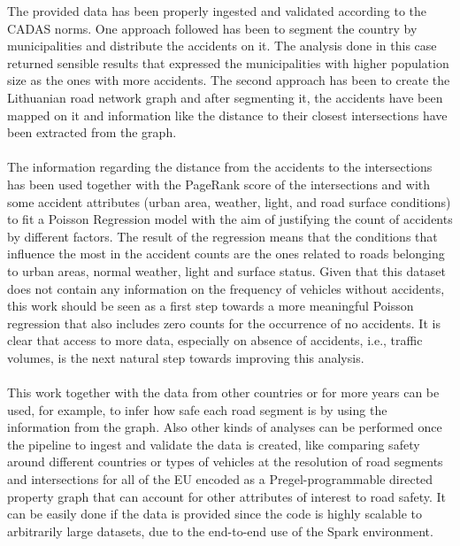 The provided data has been properly ingested and validated according to the \ac{CADAS} norms. One approach followed has been to segment the country by municipalities and distribute the accidents on it. The analysis done in this case returned sensible results that expressed the municipalities with higher population size as the ones with more accidents. The second approach has been to create the Lithuanian road network graph and after segmenting it, the accidents have been mapped on it and information like the distance to their closest intersections have been extracted from the graph. \\
\\
The information regarding the distance from the accidents to the intersections has been used together with the PageRank score of the intersections and with some accident attributes (urban area, weather, light, and road surface conditions) to fit a Poisson Regression model with the aim of justifying the count of accidents by different factors. The result of the regression means that the conditions that influence the most in the accident counts are the ones related to roads belonging to urban areas, normal weather, light and surface status. 
Given that this dataset does not contain any information on the frequency of vehicles without accidents, this work should be seen as a first step towards a more meaningful Poisson regression that also includes zero counts for the occurrence of no accidents.
It is clear that access to more data, especially on absence of accidents, i.e., traffic volumes, is the next natural step towards improving this analysis. 
\\
\\
This work together with the data from other countries or for more years can be used, for example, to infer how safe each road segment is by using the information from the graph. 
Also other kinds of analyses can be performed once the pipeline to ingest and validate the data is created, like comparing safety around different countries or types of vehicles at the resolution of road segments and intersections for all of the EU encoded as a Pregel-programmable directed property graph \cite{graphx} that can account for other attributes of interest to road safety. It can be easily done if the data is provided since the code is highly scalable to arbitrarily large datasets, due to the end-to-end use of the Spark environment. 
